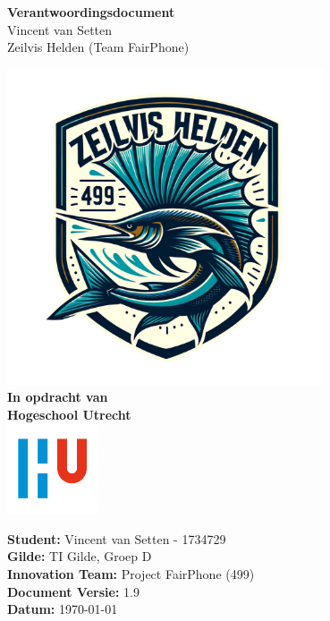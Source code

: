 \documentclass[a4paper]{report}
\newcommand{\latestVersion}{1.9}
\begin{document}
\begin{titlepage}
  \begin{center}
      \vspace*{.6cm}
      \Huge
      \textbf{ Verantwoordingsdocument }\\
      \vspace{0.2cm}
      \small Vincent van Setten \\
      \small Zeilvis Helden (Team FairPhone)

      \normalsize


      \vspace{1cm}
      \includegraphics[width=0.7\textwidth]{Images/zeilvis_helden.png}
      \vspace{1cm}
      \Large\\
      \textbf{In opdracht van}\\
      \large
      \textbf{Hogeschool Utrecht} \\
      \includegraphics[width=0.2\textwidth]{Images/logouni.png}


      \vfill
    \end{center}
      \textbf{Student:} Vincent van Setten - 1734729 \\
      \textbf{Gilde:} TI Gilde, Groep D\\
      \textbf{Innovation Team:} Project FairPhone (499) \\
      \textbf{Document Versie:} \latestVersion \\
      \textbf{Datum:} \today \\
      \vspace{2cm}
\end{titlepage}
\end{document}
